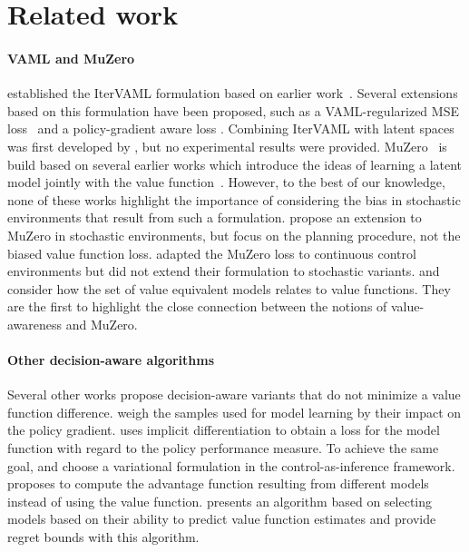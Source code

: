 \section{Related work}

\paragraph{VAML and MuZero} \textcite{itervaml}  established the IterVAML formulation based on earlier work~\parencite{vaml}.
Several extensions based on this formulation have been proposed, such as a VAML-regularized MSE loss~\parencite{voelcker2022value} and a policy-gradient aware loss \parencite{abachi2020policy}.
Combining IterVAML with latent spaces was first developed by \textcite{abachi2022viper}, but no experimental results were provided.
MuZero~\parencite{schrittwieser2020mastering,ye2021mastering} is build based on several earlier works which introduce the ideas of learning a latent model jointly with the value function~\parencite{silver2017predictron,oh2017value}.
However, to the best of our knowledge, none of these works highlight the importance of considering the bias in stochastic environments that result from such a formulation.
\textcite{antonoglou2022planning} propose an extension to MuZero in stochastic environments, but focus on the planning procedure, not the biased value function loss.
\textcite{tdmpc} adapted the MuZero loss to continuous control environments but did not extend their formulation to stochastic variants.
\textcite{grimm2020value} and \textcite{grimm2021proper} consider how the set of value equivalent models relates to value functions. 
They are the first to highlight the close connection between the notions of value-awareness and MuZero.

\paragraph{Other decision-aware algorithms} Several other works propose decision-aware variants that do not minimize a value function difference.
\textcite{doro2020gradient} weigh the samples used for model learning by their impact on the policy gradient.
\textcite{nikishin2021control} uses implicit differentiation to obtain a loss for the model function with regard to the policy performance measure. 
To achieve the same goal, \textcite{eysenbach2022mismatched} and \textcite{ghugare2023simplifying} choose a variational formulation in the control-as-inference framework.
\textcite{Modhe2021ModelAdvantageOF} proposes to compute the advantage function resulting from different models instead of using the value function.
\textcite{ayoub2020model} presents an algorithm based on selecting models based on their ability to predict value function estimates and provide regret bounds with this algorithm.


